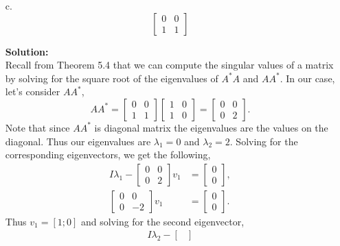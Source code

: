 \documentclass[12pt]{article}
\makeatletter
\theoremstyle{homework}
\newenvironment{exercise}[1]
{\def\@currentlabel{#1}\exercisecore}
{\endexercisecore}
\newcommand{\localhead}[1]{\par\smallskip\noindent\textbf{#1}\nobreak\\}%
\newcommand\solution{\localhead{Solution:}}
\makeatother
\begin{document}
\begin{exercise}{P10}
\begin{enumerate}
    \item[c.]
    \begin{equation*}
      \begin{bmatrix}
        0 & 0\\
        1 & 1
      \end{bmatrix}
    \end{equation*} 
  \solution Recall from Theorem 5.4 that we can compute the singular values of a matrix
  by solving for the square root of the eigenvalues of $A^*A$ and $AA^*$. In our case, let's consider $AA^*$, 
  \begin{equation*}
    AA^* = 
    \begin{bmatrix}
      0 & 0\\
      1 & 1
    \end{bmatrix}
    \begin{bmatrix}
      1 & 0\\
      1 & 0
    \end{bmatrix}
     = 
     \begin{bmatrix}
      0 & 0\\
      0 & 2
    \end{bmatrix}.
  \end{equation*}
  Note that since $AA^*$ is diagonal matrix the eigenvalues are the values on the diagonal. 
  Thus our eigenvalues are $\lambda_1 = 0$ and $\lambda_2 = 2$. Solving for the corresponding eigenvectors, 
  we get the following, 
  \begin{align*}
    I\lambda_1 - 
    \begin{bmatrix}
      0 & 0\\
      0 & 2
    \end{bmatrix}v_1 &= 
    \begin{bmatrix}
      0 \\
      0 
    \end{bmatrix},\\
    \begin{bmatrix}
        0 & 0\\
        0 & -2
    \end{bmatrix}v_1 &= 
    \begin{bmatrix}
        0 \\
        0 
    \end{bmatrix}.
  \end{align*}
  Thus $v_1 = [1;0]$ and solving for the second eigenvector,
  \begin{align*}
    I\lambda_2 - 
    \begin{bmatrix}

\end{bmatrix}
\end{align*}
\end{enumerate}
\end{exercise}
\end{document}
